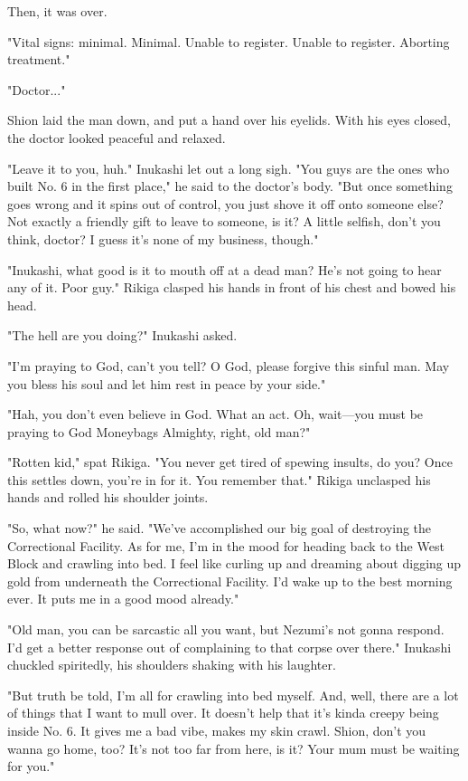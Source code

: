 Then, it was over.

{\sffamily "Vital signs: minimal. Minimal. Unable to register. Unable to register.
Aborting treatment."}

"Doctor..."

Shion laid the man down, and put a hand over his eyelids. With his eyes
closed, the doctor looked peaceful and relaxed.

"Leave it to you, huh." Inukashi let out a long sigh. "You guys are the
ones who built No. 6 in the first place," he said to the doctor's body.
"But once something goes wrong and it spins out of control, you just
shove it off onto someone else? Not exactly a friendly gift to leave to
someone, is it? A little selfish, don't you think, doctor? I guess it's
none of my business, though."

"Inukashi, what good is it to mouth off at a dead man? He's not going to
hear any of it. Poor guy." Rikiga clasped his hands in front of his
chest and bowed his head.

"The hell are you doing?" Inukashi asked.

"I'm praying to God, can't you tell? O God, please forgive this sinful
man. May you bless his soul and let him rest in peace by your side."

"Hah, you don't even believe in God. What an act. Oh, wait---you must be
praying to God Moneybags Almighty, right, old man?"

"Rotten kid," spat Rikiga. "You never get tired of spewing insults, do
you? Once this settles down, you're in for it. You remember that."
Rikiga unclasped his hands and rolled his shoulder joints.

"So, what now?" he said. "We've accomplished our big goal of destroying
the Correctional Facility. As for me, I'm in the mood for heading back
to the West Block and crawling into bed. I feel like curling up and
dreaming about digging up gold from underneath the Correctional
Facility. I'd wake up to the best morning ever. It puts me in a good
mood already."

"Old man, you can be sarcastic all you want, but Nezumi's not gonna
respond. I'd get a better response out of complaining to that corpse
over there." Inukashi chuckled spiritedly, his shoulders shaking with
his laughter.

"But truth be told, I'm all for crawling into bed myself. And, well,
there are a lot of things that I want to mull over. It doesn't help that
it's kinda creepy being inside No. 6. It gives me a bad vibe, makes my
skin crawl. Shion, don't you wanna go home, too? It's not too far from
here, is it? Your mum must be waiting for you."


